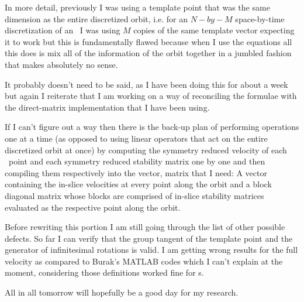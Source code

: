 \begin{description}
{In more detail, previously I was using a template point that was the same dimension as the entire discretized
orbit, i.e. for an $N-by-M$ space-by-time discretization of an \rpo\ I was using $M$ copies
of the same template vector expecting it to work but this is fundamentally flawed because
when I use the equations  all this does is mix all of the information of
the orbit together in a jumbled fashion that makes absolutely no sense.

It probably doesn't need to be said, as I have been doing this for about a week but again
I reiterate that I am working on a way of reconciling the formulae with the direct-matrix
implementation that I have been using.

If I can't figure out a way then there is the back-up
plan of performing operations one at a time (as opposed to using
linear operators that act on the entire discretized orbit at once)
by computing the symmetry reduced velocity of each \statesp\ point and each symmetry reduced
stability matrix one by one and then compiling them respectively into the vector, matrix that I need:
A vector containing the in-slice velocities at every point along the orbit and a block
diagonal matrix whose blocks are comprised of in-slice stability matrices evaluated as the
respective point along the orbit.

Before rewriting this portion I am still going through the list of other possible defects.
So far I can verify that the group tangent of the template point and the generator of infinitesimal
rotations is valid. I am getting wrong results for the full {\statesp} velocity as compared
to Burak's MATLAB codes which I can't explain at the moment, considering those definitions
worked fine for {\ppo}s.

All in all tomorrow will hopefully be a good day for my research.
}

\end{description}
